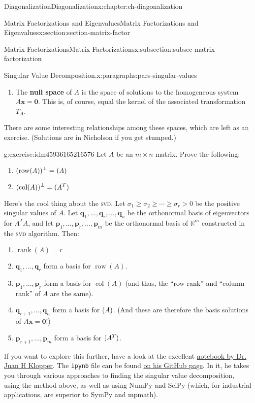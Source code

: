 \documentclass[oneside,10pt,]{book}
\newcommand{\mono}[1]{\texttt{#1}}
\newcommand{\initialism}[1]{\textsc{\MakeLowercase{#1}}}
\newcommand{\terminology}[1]{\textbf{#1}}
\numberwithin{equation}{section}
\newcommand{\R}{\mathbb{R}}
\newcommand{\csp}{\operatorname{col}}
\newcommand{\rank}{\operatorname{rank}}
\newcommand{\xx}{\mathbf{x}}
\newcommand{\zer}{\mathbf{0}}
\newcommand{\vecq}{\mathbf{q}}
\newcommand{\vecp}{\mathbf{p}}
\newcommand{\gt}{>}
\begin{document}
\begin{chapterptx}{Diagonalization}{}{Diagonalization}{}{}{x:chapter:ch-diagonalization}
\begin{sectionptx}{Matrix Factorizations and Eigenvalues}{}{Matrix Factorizations and Eigenvalues}{}{}{x:section:section-matrix-factor}
\begin{subsectionptx}{Matrix Factorizations}{}{Matrix Factorizations}{}{}{x:subsection:subsec-matrix-factorization}
\begin{paragraphs}{Singular Value Decomposition.}{x:paragraphs:pars-singular-values}
\begin{enumerate}
\item{}The \terminology{null space} of \(A\) is the space of solutions to the homogeneous system \(A\xx=\zer\). This is, of course, equal the kernel of the associated transformation \(T_A\).%
\end{enumerate}
%
\par
There are some interesting relationships among these spaces, which are left as an exercise. (Solutions are in Nicholson if you get stumped.)%
\begin{inlineexercise}{}{g:exercise:idm45936165216576}%
Let \(A\) be an \(m\times n\) matrix. Prove the following:%
\begin{enumerate}
\item{}\(\displaystyle (\operatorname{row}(A))^\bot = \null(A)\)%
\item{}\(\displaystyle (\csp(A))^\bot = \null(A^T)\)%
\end{enumerate}
%
\end{inlineexercise}%
Here's the cool thing about the \initialism{SVD}. Let \(\sigma_1\geq \sigma_2\geq \cdots \geq \sigma_r\gt 0\) be the positive singular values of \(A\). Let \(\vecq_1,\ldots, \vecq_r,\ldots, \vecq_n\) be the orthonormal basis of eigenvectors for \(A^TA\), and let \(\vecp_1,\ldots, \vecp_r,\ldots, \vecp_m\) be the orthonormal basis of \(\R^m\) constructed in the \initialism{SVD} algorithm. Then:%
\par
%
\begin{enumerate}
\item{}\(\displaystyle \rank(A)=r\)%
\item{}\(\vecq_1,\ldots, \vecq_r\) form a basis for \(\operatorname{row}(A)\).%
\item{}\(\vecp_1,\ldots, \vecp_r\) form a basis for \(\csp(A)\) (and thus, the ``row rank'' and ``column rank'' of \(A\) are the same).%
\item{}\(\vecq_{r+1},\ldots, \vecq_n\) form a basis for \(\null(A)\). (And these are therefore the basis solutions of \(A\xx=\zer\)!)%
\item{}\(\vecp_{r+1},\ldots, \vecp_m\) form a basis for \(\null(A^T)\).%
\end{enumerate}
%
\par
If you want to explore this further, have a look at the excellent \href{https://www.juanklopper.com/wp-content/uploads/2015/03/III_05_Singular_value_decomposition.html}{notebook by Dr. Juan H Klopper}. The \mono{ipynb} file can be found \href{https://github.com/juanklopper/MIT_OCW_Linear_Algebra_18_06}{on his GitHub page}. In it, he takes you through various approaches to finding the singular value decomposition, using the method above, as well as using NumPy and SciPy (which, for industrial applications, are superior to SymPy and mpmath).%

\end{paragraphs}
\end{subsectionptx}
\end{sectionptx}
\end{chapterptx}
\end{document}
